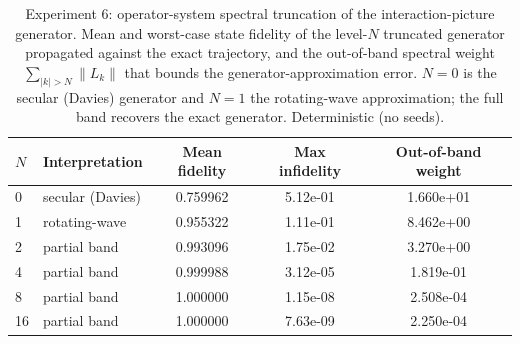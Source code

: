 \begin{table}[ht]
\centering
\caption{Experiment 6: operator-system spectral truncation of the interaction-picture generator. Mean and worst-case state fidelity of the level-$N$ truncated generator propagated against the exact trajectory, and the out-of-band spectral weight $\sum_{|k|>N}\lVert L_k\rVert$ that bounds the generator-approximation error. $N{=}0$ is the secular (Davies) generator and $N{=}1$ the rotating-wave approximation; the full band recovers the exact generator. Deterministic (no seeds).}
\label{tab:exp6}
\begin{tabular}{llccc}
\toprule
$N$ & Interpretation & Mean fidelity & Max infidelity & Out-of-band weight \\
\midrule
0 & secular (Davies) & 0.759962 & 5.12e-01 & 1.660e+01 \\
1 & rotating-wave & 0.955322 & 1.11e-01 & 8.462e+00 \\
2 & partial band & 0.993096 & 1.75e-02 & 3.270e+00 \\
4 & partial band & 0.999988 & 3.12e-05 & 1.819e-01 \\
8 & partial band & 1.000000 & 1.15e-08 & 2.508e-04 \\
16 & partial band & 1.000000 & 7.63e-09 & 2.250e-04 \\
\bottomrule
\end{tabular}
\end{table}
